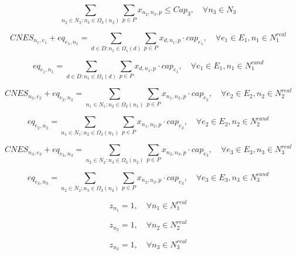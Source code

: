\begin{equation}
\sum_{n_2 \in N_2: n_3 \in \Omega_3(n_2)} \sum_{p \in P} x_{n_2,n_3,p} \leq Cap_3, \quad \forall n_3 \in N_3 \tag{10}
\end{equation}

\begin{equation}
CNES_{n_1,e_1} + eq_{e_1,n_1} = \sum_{d \in D: n_1 \in \Omega_1(d)} \sum_{p \in P} x_{d,n_1,p} \cdot cap_{e_1}, \quad \forall e_1 \in E_1, n_1 \in N_1^{real} \tag{11}
\end{equation}

\begin{equation}
eq_{e_1,n_1} = \sum_{d \in D: n_1 \in \Omega_1(d)} \sum_{p \in P} x_{d,n_1,p} \cdot cap_{e_1}, \quad \forall e_1 \in E_1, n_1 \in N_1^{cand} \tag{12}
\end{equation}

\begin{equation}
CNES_{n_2,e_2} + eq_{e_2,n_2} = \sum_{n_1 \in N_1: n_2 \in \Omega_2(n_1)} \sum_{p \in P} x_{n_1,n_2,p} \cdot cap_{e_2}, \quad \forall e_2 \in E_2, n_2 \in N_2^{real} \tag{13}
\end{equation}

\begin{equation}
eq_{e_2,n_2} = \sum_{n_1 \in N_1: n_2 \in \Omega_2(n_1)} \sum_{p \in P} x_{n_1,n_2,p} \cdot cap_{e_2}, \quad \forall e_2 \in E_2, n_2 \in N_2^{cand} \tag{14}
\end{equation}

\begin{equation}
CNES_{n_3,e_3} + eq_{e_3,n_3} = \sum_{n_2 \in N_2: n_3 \in \Omega_3(n_2)} \sum_{p \in P} x_{n_2,n_3,p} \cdot cap_{e_3}, \quad \forall e_3 \in E_3, n_3 \in N_3^{real} \tag{15}
\end{equation}

\begin{equation}
eq_{e_3,n_3} = \sum_{n_2 \in N_2: n_3 \in \Omega_3(n_2)} \sum_{p \in P} x_{n_2,n_3,p} \cdot cap_{e_3}, \quad \forall e_3 \in E_3, n_3 \in N_3^{cand} \tag{16}
\end{equation}

\begin{equation}
z_{n_1} = 1, \quad \forall n_1 \in N_1^{real} \tag{17}
\end{equation}

\begin{equation}
z_{n_2} = 1, \quad \forall n_2 \in N_2^{real} \tag{18}
\end{equation}

\begin{equation}
z_{n_3} = 1, \quad \forall n_3 \in N_3^{real} \tag{19}
\end{equation}

